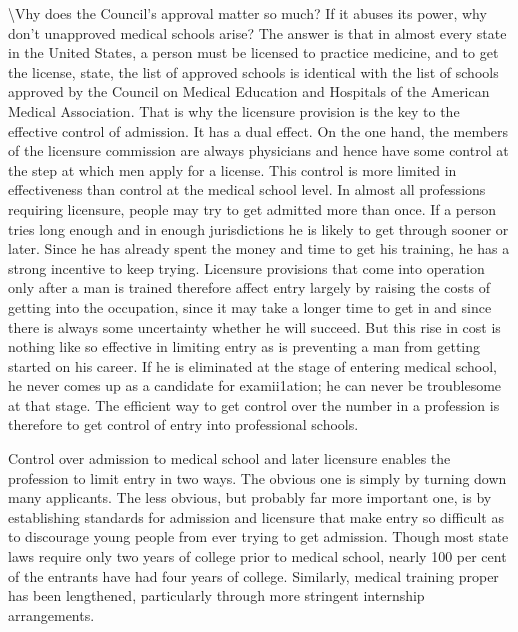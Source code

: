 \documentclass[11pt,openany]{book}
\begin{document}
\textbackslash{}Vhy does the Council's approval matter so much? If it abuses its power, why don't unapproved medical schools arise? The answer is that in almost every state in the United States, a person must be licensed to practice medicine, and to get the license, state, the list of approved schools is identical with the list of schools approved by the Council on Medical Education and Hospitals of the American Medical Association. That is why the licensure provision is the key to the effective control of admission. It has a dual effect. On the one hand, the members of the licensure commission are always physicians and hence have some control at the step at which men apply for a license. This control is more limited in effectiveness than control at the medical school level. In almost all professions requiring licensure, people may try to get admitted more than once. If a person tries long enough and in enough jurisdictions he is likely to get through sooner or later. Since he has already spent the money and time to get his training, he has a strong incentive to keep trying. Licensure provisions that come into operation only after a man is trained therefore affect entry largely by raising the costs of getting into the occupation, since it may take a longer time to get in and since there is always some uncertainty whether he will succeed. But this rise in cost is nothing like so effective in limiting entry as is preventing a man from getting started on his career. If he is eliminated at the stage of entering medical school, he never comes up as a candidate for examii1ation; he can never be troublesome at that stage. The efficient way to get control over the number in a profession is therefore to get control of entry into professional schools.

Control over admission to medical school and later licensure enables the profession to limit entry in two ways. The obvious one is simply by turning down many applicants. The less obvious, but probably far more important one, is by establishing standards for admission and licensure that make entry so difficult as to discourage young people from ever trying to get admission. Though most state laws require only two years of college prior to medical school, nearly 100 per cent of the entrants have had four years of college. Similarly, medical training proper has been lengthened, particularly through more stringent internship arrangements.
\end{document}
